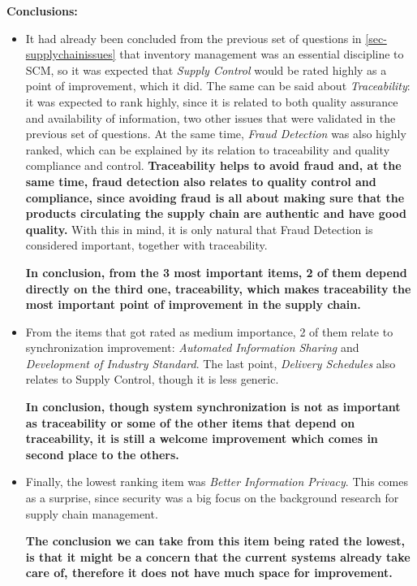 \par \textbf{Conclusions: }
\begin{itemize}

    \item It had already been concluded from the previous set of questions in \ref{sec-supplychainissues} that inventory management was an essential discipline to SCM, so it was expected that \textit{Supply Control} would be rated highly as a point of improvement, which it did. The same can be said about \textit{Traceability}: it was expected to rank highly, since it is related to both quality assurance and availability of information, two other issues that were validated in the previous set of questions. At the same time, \textit{Fraud Detection} was also highly ranked, which can be explained by its relation to traceability and quality compliance and control. \textbf{Traceability helps to avoid fraud and, at the same time, fraud detection also relates to quality control and compliance, since avoiding fraud is all about making sure that the products circulating the supply chain are authentic and have good quality.} With this in mind, it is only natural that Fraud Detection is considered important, together with traceability.

\textbf{In conclusion, from the 3 most important items, 2 of them depend directly on the third one, traceability, which makes traceability the most important point of improvement in the supply chain.}

\item From the items that got rated as medium importance, 2 of them relate to synchronization improvement: \textit{Automated Information Sharing} and \textit{Development of Industry Standard}. The last point, \textit{Delivery Schedules} also relates to Supply Control, though it is less generic.

\textbf{In conclusion, though system synchronization is not as important as traceability or some of the other items that depend on traceability, it is still a welcome improvement which comes in second place to the others.}


\item Finally, the lowest ranking item was \textit{Better Information Privacy}. This comes as a surprise, since security was a big focus on the background research for supply chain management. 

\textbf{The conclusion we can take from this item being rated the lowest, is that it might be a concern that the current systems already take care of, therefore it does not have much space for improvement.}
\end{itemize}


